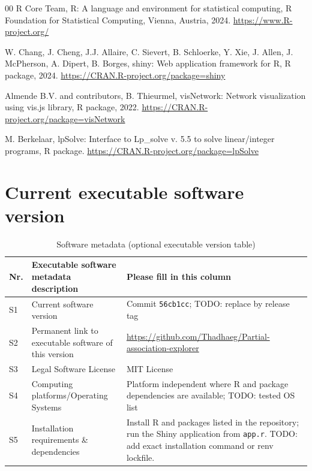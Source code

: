 \documentclass[preprint,12pt,a4paper]{elsarticle}
\numberwithin{equation}{section}
\begin{document}
\begin{thebibliography}{00}
R Core Team, R: A language and environment for statistical computing, R Foundation for Statistical Computing, Vienna, Austria, 2024. \url{https://www.R-project.org/}

W. Chang, J. Cheng, J.J. Allaire, C. Sievert, B. Schloerke, Y. Xie, J. Allen, J. McPherson, A. Dipert, B. Borges, shiny: Web application framework for R, R package, 2024. \url{https://CRAN.R-project.org/package=shiny}

Almende B.V. and contributors, B. Thieurmel, visNetwork: Network visualization using vis.js library, R package, 2022. \url{https://CRAN.R-project.org/package=visNetwork}

M. Berkelaar, lpSolve: Interface to Lp\_solve v. 5.5 to solve linear/integer programs, R package. \url{https://CRAN.R-project.org/package=lpSolve}

\end{thebibliography}

\section*{Current executable software version}

\begin{table}[!h]
\begin{tabular}{|l|p{6.5cm}|p{6.5cm}|}
\hline
\textbf{Nr.} & \textbf{Executable software metadata description} & \textbf{Please fill in this column} \\
\hline
S1 & Current software version & Commit \texttt{56cb1cc}; TODO: replace by release tag \\
\hline
S2 & Permanent link to executable software of this version & \url{https://github.com/Thadhaeg/Partial-association-explorer} \\
\hline
S3 & Legal Software License & MIT License \\
\hline
S4 & Computing platforms/Operating Systems & Platform independent where R and package dependencies are available; TODO: tested OS list \\
\hline
S5 & Installation requirements \& dependencies & Install R and packages listed in the repository; run the Shiny application from \texttt{app.r}. TODO: add exact installation command or renv lockfile. \\
\hline
\end{tabular}
\caption{Software metadata (optional executable version table)}
\label{tab:software-metadata}
\end{table}
\end{document}

